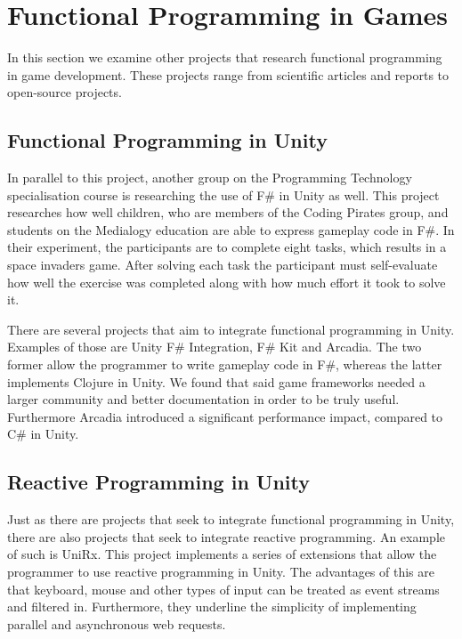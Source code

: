 \section{Functional Programming in Games}
In this section we examine other projects that research functional programming in game development. These projects range from scientific articles and reports to open-source projects.

\subsection{Functional Programming in Unity}
In parallel to this project, another group on the Programming Technology specialisation course is researching the use of F\# in Unity as well. This project researches how well children, who are members of the Coding Pirates group, and students on the Medialogy education are able to express gameplay code in F\#. In their experiment, the participants are to complete eight tasks, which results in a space invaders game. After solving each task the participant must self-evaluate how well the exercise was completed along with how much effort it took to solve it\cite{bolhuis2019gameplay}. 

There are several projects that aim to integrate functional programming in Unity. Examples of those are Unity F\# Integration\cite{fsharp2019plugin}, F\# Kit\cite{fsharp:kit} and Arcadia\cite{arcadia:github}. The two former allow the programmer to write gameplay code in F\#, whereas the latter implements Clojure in Unity. We found that said game frameworks needed a larger community and better documentation in order to be truly useful. Furthermore Arcadia introduced a significant performance impact, compared to C\# in Unity. 

\subsection{Reactive Programming in Unity}
Just as there are projects that seek to integrate functional programming in Unity, there are also projects that seek to integrate reactive programming. An example of such is UniRx\cite{unirx}. This project implements a series of extensions that allow the programmer to use reactive programming in Unity. The advantages of this are that keyboard, mouse and other types of input can be treated as event streams and filtered in. Furthermore, they underline the simplicity of implementing parallel and asynchronous web requests\cite{unirx:github}.

